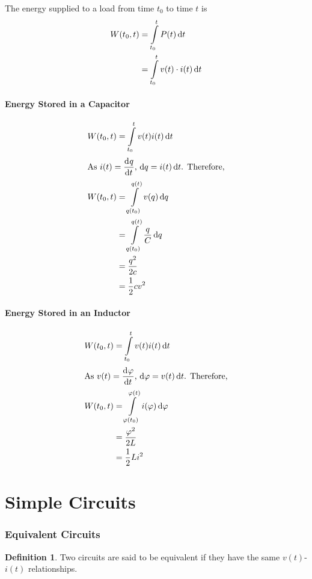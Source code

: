 \documentclass[fleqn, a4paper, 12pt, twoside]{article}
\theoremstyle{definition}
\newtheorem{definition}{Definition}
\theoremstyle{theorem}
\begin{document}
The energy supplied to a load from time $t_0$ to time $t$ is
\begin{align*}
	W(t_0, t) &= \int\limits_{t_0}^{t} P(t) \dif t\\
	&= \int\limits_{t_0}^{t} v(t) \cdot i(t) \dif t
\end{align*}

\subsection{Energy Stored in a Capacitor}

\begin{align*}
	W(t_0, t) &= \int\limits_{t_0}^{t} v(t) i(t) \dif t\\
	\intertext{As $i(t) = \dod{q}{t}$, $\dif q = i(t) \dif t$. Therefore,}
	W(t_0, t) &= \int\limits_{q(t_0)}^{q(t)} v(q) \dif q\\
	&= \int\limits_{q(t_0)}^{q(t)} \dfrac{q}{C} \dif q\\
	&= \dfrac{q^2}{2c}\\
	&= \dfrac{1}{2} c v^2
\end{align*}

\subsection{Energy Stored in an Inductor}

\begin{align*}
	W(t_0, t) &= \int\limits_{t_0}^{t} v(t) i(t) \dif t\\
	\intertext{As $v(t) = \dod{\varphi}{t}$, $\dif \varphi = v(t) \dif t$. Therefore,}
	W(t_0, t) &= \int\limits_{\varphi(t_0)}^{\varphi(t)} i(\varphi) \dif \varphi\\
	&= \dfrac{\varphi^2}{2 L}\\
	&= \dfrac{1}{2} L i^2
\end{align*}

\newpage
\part{Simple Circuits}

\section{Equivalent Circuits}

\begin{definition}
	Two circuits are said to be equivalent if they have the same $v(t)$-$i(t)$ relationships.
\end{definition}
\end{document}
